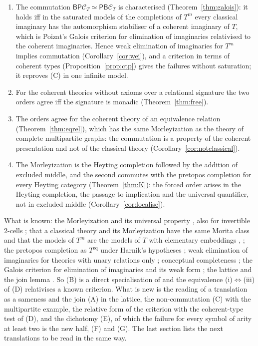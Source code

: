 \documentclass[11pt]{amsart}
\theoremstyle{definition}
\newcommand{\PP}{\mathsf P}
\newcommand{\BB}{\mathsf B}
\newcommand{\cC}{\mathcal C}
\begin{document}
\begin{enumerate}
\item[(D)] The commutation $\BB\PP\cC_T\simeq\PP\BB\cC_T$ is
characterised (Theorem~\ref{thm:galois}): it holds iff in the saturated
models of the completions of $T^m$ every classical imaginary has the
automorphism stabiliser of a coherent imaginary of $T$, which is
Poizat's Galois criterion for elimination of imaginaries \cite{Poizat83}
relativised to the coherent imaginaries. Hence weak elimination of
imaginaries for $T^m$ implies commutation (Corollary~\ref{cor:wei}),
and a criterion in terms of coherent types (Proposition~\ref{prop:ctp})
gives the failures without saturation; it reproves (C) in one infinite
model.
\item[(E)] For the coherent theories without axioms over a relational
signature the two orders agree iff the signature is monadic
(Theorem~\ref{thm:free}).
\item[(F)] The orders agree for the coherent theory of an equivalence
relation (Theorem~\ref{thm:eqrel}), which has the same Morleyization as
the theory of complete multipartite graphs: the commutation is a
property of the coherent presentation and not of the classical theory
(Corollary~\ref{cor:notclassical}).
\item[(G)] The Morleyization is the Heyting completion followed by the
addition of excluded middle, and the second commutes with the pretopos
completion for every Heyting category (Theorem~\ref{thm:K}): the forced
order arises in the Heyting completion, the passage to implication and
the universal quantifier, not in excluded middle (Corollary~\ref{cor:localise}).
\end{enumerate}
What is known: the Morleyization and its universal property
\cite[D1.5.13]{Elephant}, also for invertible $2$-cells
\cite[\S6.2, Prop.~6.5]{DPM20}; that a classical theory and its Morleyization have
the same Morita class and that the models of $T^m$ are the models of
$T$ with elementary embeddings \cite[\S5]{Tsem17}, \cite{HT17}; the pretopos
completion as $T^{\mathrm{eq}}$ under Harnik's hypotheses
\cite{Harnik11}; weak elimination of imaginaries for theories with
unary relations only \cite[Rem.~7.14]{CDHJR};
conceptual completeness \cite{MR77}; the Galois criterion for
elimination of imaginaries and its weak form
\cite{Poizat83,CF04}; the lattice and the join lemma
\cite{Same,TheoryComp}. So (B) is a direct specialisation of
\cite{MR77} and the equivalence (i)$\Leftrightarrow$(iii) of (D)
relativises a known criterion. What is new is the reading of a
translation as a sameness and the join (A) in the lattice, the
non-commutation (C) with the multipartite example, the relative form of
the criterion with the coherent-type test of (D), and the dichotomy
(E), of which the failure for every symbol of arity at least two is the
new half, (F) and (G). The last section lists the next translations to be
read in the same way.
\end{document}
